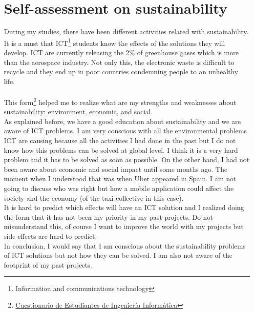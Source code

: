 
\chapter{Self-assessment on sustainability} %

\label{Chapter1}

During my studies, there have been different activities related with sustainability. It is a must that ICT\footnote{Information and communications technology} students know the effects of the solutions they will develop. 
ICT are currently releasing the 2\% of greenhouse gases\cite{Universidad2013} which is more than the aerospace industry. Not only this, the electronic waste is difficult to recycle and they end up in poor countries\cite{Ghana} condemning people to an unhealthy life.\\\\

This form\footnote{\href{goo.gl/kWLMLE}{Cuestionario de Estudiantes de Ingeniería Informática}} helped me to realize what are my strengths and weaknesses about sustainability: environment, economic, and social.\\

As explained before, we have a good education about sustainability and we are aware of ICT problems. I am very conscious with all the environmental problems ICT are causing because all the activities I had done in the past but I do not know how this problems can be solved at global level. I think it is a very hard problem and it has to be solved as soon as possible. On the other hand, I had not been aware about economic and social impact until some months ago. The moment when I understood that was when Uber appeared in Spain\cite{UberTaxi}. I am not going to discuss who was right but how a mobile application could affect the society and the economy (of the taxi collective in this case).\\

It is hard to predict which effects will have an ICT solution and I realized doing the form that it has not been my priority in my past projects. Do not misunderstand this, of course I want to improve the world with my projects but side effects are hard to predict. \\

In conclusion, I would say that I am conscious about the sustainability problems of ICT solutions but not how they can be solved. I am also not aware of the footprint of my past projects. 

